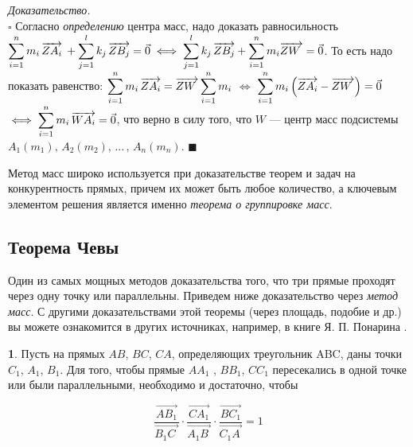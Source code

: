 \documentclass[14pt]{extarticle}
\let\Overrightarrow\overrightarrow
\theoremstyle{definition}
\theoremstyle{theorem}
\newenvironment{namedtheorem}[2]
{
\newcommand{\foo}{#1}
\newtheorem*{\foo{}}{\normalfont\fontsize{15}{15}{Теорема #2}}
\begin{\foo{}}
}
{\end{\foo{}}}
\renewenvironment{proof}
    {\noindent \textit{Доказательство.}\\
	\indent $\square$}
	{ $\blacksquare$\\ }
\begin{document}
\begin{proof}
Согласно \textit{определению} центра масс, надо доказать равносильность\\
$\mathlarger{\sum_{i=1}^{n} m_i \, \Overrightarrow{ZA_i} \: + 
\sum_{j=1}^{l} k_j \, \Overrightarrow{ZB_j}} = \vec{0} \iff 
\mathlarger{\sum_{j=1}^{l} k_j \, \Overrightarrow{ZB_j} + 
	 \sum_{i=1}^{n} m_i  \Overrightarrow{ZW_{\: \,}}} = \vec{0}$.
То есть надо показать равенство:
$\mathlarger{\sum_{i=1}^{n} m_i \, \Overrightarrow{ZA_i} = 
\Overrightarrow{ZW_{\: \,}} \sum_{i=1}^{n} m_i}$ $\iff$   
$\mathlarger{\sum_{i=1}^{n}
m_i \, \Big(\Overrightarrow{ZA_i} - \Overrightarrow{ZW_{\: \,}}\Big)} = \vec{0}$ 
$\iff \mathlarger{\sum_{i=1}^{n}
m_i \, \Overrightarrow{WA_i}} = \vec{0}$, что верно в силу того, что $W$ ---
центр масс подсистемы $A_1(m_1), \, A_2(m_2), \, ... \, , \, A_n(m_n)$.
\end{proof}


Метод масс широко используется при доказательстве теорем и задач на
конкурентность прямых, причем их может быть любое количество, а ключевым 
элементом решения является именно \textit{теорема о группировке масс}. 


\subsection{Теорема Чевы} 

\indent Один из самых мощных методов доказательства того, что три прямые 
проходят через одну точку или параллельны. 
Приведем ниже доказательство через \textit{метод масс}.
С другими доказательствами этой теоремы (через площадь, подобие и др.) 
вы можете ознакомится в других источниках, например, в книге Я. П. Понарина
.


\begin{namedtheorem}{ceva}{Чевы}
	Пусть на прямых $AB$, $BC$, $CA$, определяющих
    треугольник ABC, даны точки $C_1$, $A_1$, $B_1$. Для того, чтобы прямые
    $AA_1$ , $BB_1$, $CC_1$ пересекались в одной точке или были параллельными,
    необходимо и достаточно, чтобы
	
	\begin{ceqn}
	\[
    \dfrac{\Overrightarrow{AB_1}}{\Overrightarrow{B_1C_{\, \,}}} \cdot 
	\dfrac{\Overrightarrow{CA_1}}
	{\Overrightarrow{A_1B_{\:}}} \cdot \dfrac{\Overrightarrow{BC_1}}
	{\Overrightarrow{C_1A_{\,}}} = 1
	\]
    \end{ceqn}

\end{namedtheorem}
\end{document}
